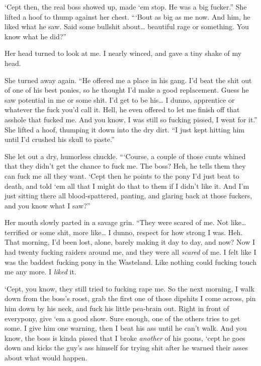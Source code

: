 \leavevmode{}‘Cept then, the real boss showed up, made ‘em stop. He was a big fucker.” She lifted a hoof to thump against her chest. “‘Bout as big as me now. And him, he liked what he saw. Said some bullshit about… beautiful rage or something. You know what he did?”

Her head turned to look at me. I nearly winced, and gave a tiny shake of my head.

She turned away again. “He offered me a place in his gang. I’d beat the shit out of one of his best ponies, so he thought I’d make a good replacement. Guess he saw potential in me or some shit. I’d get to be his… I dunno, apprentice or whatever the fuck you’d call it. Hell, he even offered to let me finish off that asshole that fucked me. And you know, I was still so fucking pissed, I went for it.” She lifted a hoof, thumping it down into the dry dirt. “I just kept hitting him until I’d crushed his skull to paste.”

She let out a dry, humorless chuckle. “‘Course, a couple of those cunts whined that they didn’t get the chance to fuck me. The boss? Heh, he tells them they can fuck me all they want. ‘Cept then he points to the pony I’d just beat to death, and told ‘em all that I might do that to them if I didn’t like it. And I’m just sitting there all blood-spattered, panting, and glaring back at those fuckers, and you know what I saw?”

Her mouth slowly parted in a savage grin. “They were scared of me. Not like… terrified or some shit, more like… I dunno, respect for how strong I was. Heh. That morning, I’d been lost, alone, barely making it day to day, and now? Now I had twenty fucking raiders around me, and they were all \textit{scared} of me. I felt like I was the baddest fucking pony in the Wasteland. Like nothing could fucking touch me any more. I \textit{liked} it.

\leavevmode{}‘Cept, you know, they still tried to fucking rape me. So the next morning, I walk down from the boss’s roost, grab the first one of those dipshits I come across, pin him down by his neck, and fuck his little pea-brain out. Right in front of everypony, give ‘em a good show. Sure enough, one of the others tries to get some. I give him one warning, then I beat his ass until he can’t walk. And you know, the boss is kinda pissed that I broke \textit{another} of his goons, ‘cept he goes down and kicks the guy’s ass himself for trying shit after he warned their asses about what would happen.

